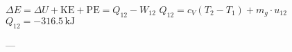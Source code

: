 \( \Delta E = \Delta U + \text{KE} + \text{PE} = Q_{12} - W_{12} \)  
\( Q_{12} = c_V (T_2 - T_1) + m_g \cdot u_{12} \)  
\( Q_{12} = -316.5 \, \text{kJ} \)

---